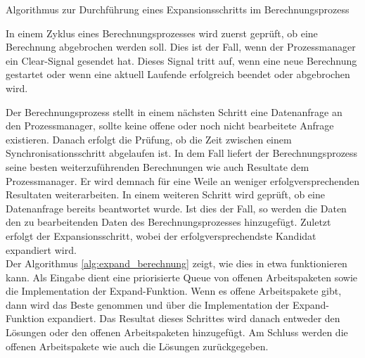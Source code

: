 \begin{algorithm}[H]
    \DontPrintSemicolon
    \caption{Algorithmus zur Durchführung eines Expansionsschritts im Berechnungsprozess}
    \label{alg:distribute_manager}
\end{algorithm}

In einem Zyklus eines Berechnungsprozesses wird zuerst geprüft, ob eine Berechnung abgebrochen werden soll. Dies ist der
Fall, wenn der Prozessmanager ein \glqq Clear-Signal\grqq{} gesendet hat. Dieses Signal tritt auf, wenn eine neue
Berechnung gestartet oder wenn eine aktuell Laufende erfolgreich beendet oder abgebrochen wird.

Der Berechnungsprozess stellt in einem nächsten Schritt eine Datenanfrage an den Prozessmanager, sollte keine offene oder
noch nicht bearbeitete Anfrage existieren. Danach erfolgt die Prüfung, ob die Zeit zwischen einem Synchronisationsschritt
abgelaufen ist. In dem Fall liefert der Berechnungsprozess seine besten weiterzuführenden Berechnungen wie auch Resultate
dem Prozessmanager. Er wird demnach für eine Weile an weniger erfolgversprechenden Resultaten weiterarbeiten. In einem
weiteren Schritt wird geprüft, ob eine Datenanfrage bereits beantwortet wurde. Ist dies der Fall, so werden die
Daten den zu bearbeitenden Daten des Berechnungsprozesses hinzugefügt. Zuletzt erfolgt der Expansionsschritt, wobei der
erfolgversprechendste Kandidat expandiert wird. \\
Der Algorithmus \ref{alg:expand_berechnung} zeigt, wie dies in etwa funktionieren kann.
Als Eingabe dient eine priorisierte Queue von offenen Arbeitspaketen sowie die Implementation der \glqq Expand-Funktion\grqq.
Wenn es offene Arbeitspakete gibt, dann wird das Beste genommen und über die Implementation der
\glqq Expand-Funktion\grqq{} expandiert. Das Resultat dieses Schrittes wird danach entweder den Lösungen oder den
offenen Arbeitspaketen hinzugefügt. Am Schluss werden die offenen Arbeitspakete wie auch die Lösungen zurückgegeben.

